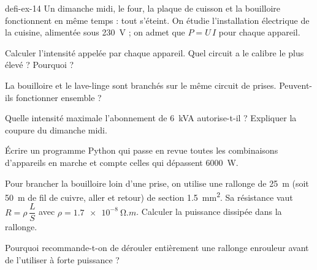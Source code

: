 \begin{blocEdition}{defi-ex-14}
Un dimanche midi, le four, la plaque de cuisson et la bouilloire fonctionnent en même temps : tout s'éteint. On étudie
l'installation électrique de la cuisine, alimentée sous \qty{230}{V} ; on admet que $P=U\,I$ pour chaque appareil.
\begin{questions}
\item Calculer l'intensité appelée par chaque appareil. Quel circuit a le calibre le plus élevé ? Pourquoi ?
\item La bouilloire et le lave-linge sont branchés sur le même circuit de prises. Peuvent-ils fonctionner ensemble ?
\item Quelle intensité maximale l'abonnement de \qty{6}{kVA} autorise-t-il ? Expliquer la coupure du dimanche midi.
\item Écrire un programme Python qui passe en revue toutes les combinaisons d'appareils en marche et compte celles qui
dépassent \qty{6000}{W}.
\item Pour brancher la bouilloire loin d'une prise, on utilise une rallonge de \qty{25}{m} (soit \qty{50}{m} de fil de cuivre, aller et retour) de
section \qty{1,5}{mm^2}. Sa résistance vaut $R=\rho\,\dfrac{L}{S}$ avec $\rho=\qty{1,7e-8}{\ohm.m}$. Calculer la puissance dissipée dans la rallonge.
\item Pourquoi recommande-t-on de dérouler entièrement une rallonge enrouleur avant de l'utiliser à forte puissance ?
\end{questions}
\end{blocEdition}

